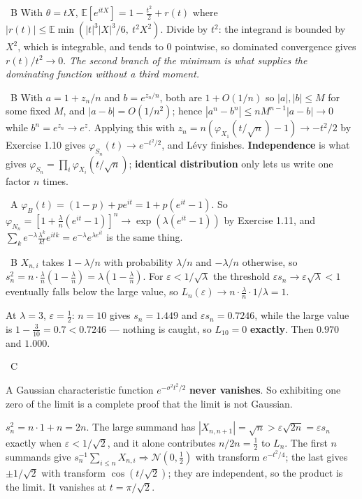 \documentclass[10pt]{article}
\newcommand{\Q}[2]{\medskip\noindent{\color{acc}\textbf{#1}}\ {\scriptsize\color{grey}\textsc{#2}}\quad}
\newcommand{\E}{\mathbb{E}}
\newcommand{\Nor}{\mathcal{N}}
\begin{document}
\Q{1.10}{B} With $\theta=tX$, $\E[e^{itX}]=1-\tfrac{t^2}{2}+r(t)$ where $|r(t)|\le\E\min(|t|^3|X|^3/6,\ t^2X^2)$. Divide by $t^2$: the integrand is bounded by $X^2$, which is integrable, and tends to $0$ pointwise, so dominated convergence gives $r(t)/t^2\to0$. \emph{The second branch of the minimum is what supplies the dominating function without a third moment.}

\Q{1.11}{B} With $a=1+z_n/n$ and $b=e^{z_n/n}$, both are $1+O(1/n)$ so $|a|,|b|\le M$ for some fixed $M$, and $|a-b|=O(1/n^2)$; hence $|a^n-b^n|\le nM^{n-1}|a-b|\to0$ while $b^n=e^{z_n}\to e^z$. Applying this with $z_n=n(\varphi_{X_1}(t/\sqrt n)-1)\to-t^2/2$ by Exercise 1.10 gives $\varphi_{S_n}(t)\to e^{-t^2/2}$, and L\'evy finishes. \textbf{Independence} is what gives $\varphi_{S_n}=\prod_i\varphi_{X_i}(t/\sqrt n)$; \textbf{identical distribution} only lets us write one factor $n$ times.

\Q{1.12}{A} $\varphi_B(t)=(1-p)+pe^{it}=1+p(e^{it}-1)$. So $\varphi_{N_n}=[1+\tfrac\lambda n(e^{it}-1)]^n\to\exp(\lambda(e^{it}-1))$ by Exercise 1.11, and $\sum_ke^{-\lambda}\frac{\lambda^k}{k!}e^{itk}=e^{-\lambda}e^{\lambda e^{it}}$ is the same thing.

\Q{1.13}{B} $X_{n,i}$ takes $1-\lambda/n$ with probability $\lambda/n$ and $-\lambda/n$ otherwise, so $s_n^2=n\cdot\frac\lambda n(1-\frac\lambda n)=\lambda(1-\frac\lambda n)$. For $\varepsilon<1/\sqrt\lambda$ the threshold $\varepsilon s_n\to\varepsilon\sqrt\lambda<1$ eventually falls below the large value, so $L_n(\varepsilon)\to n\cdot\frac\lambda n\cdot1/\lambda=1$.

At $\lambda=3$, $\varepsilon=\tfrac12$: $n=10$ gives $s_n=1.449$ and $\varepsilon s_n=0.7246$, while the large value is $1-\tfrac3{10}=0.7<0.7246$ --- nothing is caught, so $L_{10}=0$ \textbf{exactly}. Then $0.970$ and $1.000$.

\Q{1.14}{C}
\begin{idea}
A Gaussian characteristic function $e^{-\sigma^2t^2/2}$ \textbf{never vanishes}. So exhibiting one zero of the limit is a complete proof that the limit is not Gaussian.
\end{idea}
$s_n^2=n\cdot1+n=2n$. The large summand has $|X_{n,n+1}|=\sqrt n>\varepsilon\sqrt{2n}=\varepsilon s_n$ exactly when $\varepsilon<1/\sqrt2$, and it alone contributes $n/2n=\tfrac12$ to $L_n$. The first $n$ summands give $s_n^{-1}\sum_{i\le n}X_{n,i}\Rightarrow\Nor(0,\tfrac12)$ with transform $e^{-t^2/4}$; the last gives $\pm1/\sqrt2$ with transform $\cos(t/\sqrt2)$; they are independent, so the product is the limit. It vanishes at $t=\pi/\sqrt2$.
\end{document}
